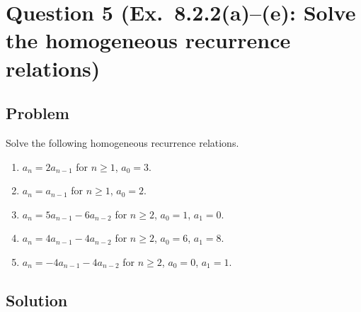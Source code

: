 \documentclass[12pt]{article}
\begin{document}
\section{Question 5 (Ex.\ 8.2.2(a)--(e): Solve the homogeneous recurrence relations)}

\subsection{Problem}
Solve the following homogeneous recurrence relations.
\begin{enumerate}[label=(\alph*)]
\item \(a_n=2a_{n-1}\) for \(n\ge 1\), \(a_0=3\).
\item \(a_n=a_{n-1}\) for \(n\ge 1\), \(a_0=2\).
\item \(a_n=5a_{n-1}-6a_{n-2}\) for \(n\ge 2\), \(a_0=1\), \(a_1=0\).
\item \(a_n=4a_{n-1}-4a_{n-2}\) for \(n\ge 2\), \(a_0=6\), \(a_1=8\).
\item \(a_n=-4a_{n-1}-4a_{n-2}\) for \(n\ge 2\), \(a_0=0\), \(a_1=1\).
\end{enumerate}

\subsection{Solution}
\end{document}
